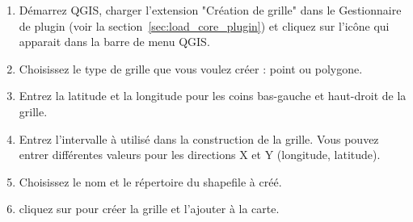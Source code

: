 \begin{enumerate}
\item Démarrez QGIS, charger l'extension "Création de grille" dans le
Gestionnaire de plugin (voir la section~\ref{sec:load_core_plugin}) et cliquez
sur l'icône   qui apparait dans la
barre de menu QGIS.
\item Choisissez le type de grille que vous voulez créer : point ou polygone.
\item Entrez la latitude et la longitude pour les coins bas-gauche et
haut-droit de la grille.
\item Entrez l'intervalle à utilisé dans la construction de la grille. Vous
pouvez entrer différentes valeurs pour les directions X et Y (longitude,
latitude).
\item Choisissez le nom et le répertoire du shapefile à créé.
\item cliquez sur  pour créer la grille et l'ajouter à la carte.
\end{enumerate} 



